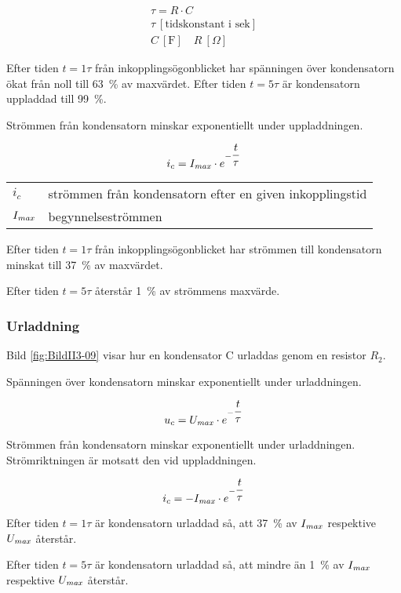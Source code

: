 \begin{gather*}
  \tau = R \cdot C \\
  \tau\ [\text{tidskonstant i sek}] \\
  C\ [\text{F}] \quad R\ [\Omega]
\end{gather*}

Efter tiden \(t = 1\tau\) från inkopplingsögonblicket har spänningen över
kondensatorn ökat från noll till 63~\% av maxvärdet.
Efter tiden \(t = 5\tau\) är kondensatorn uppladdad till 99~\%.

Strömmen från kondensatorn minskar exponentiellt under uppladdningen.

\[i_c = I_{\it max} \cdot e^{-\dfrac{t}{\tau}}\]

\begin{tabular}{lp{}}
  \(i_c\) & strömmen från kondensatorn efter en given inkopplingstid \\
  \(I_{\it max}\) & begynnelseströmmen \\
\end{tabular}

Efter tiden \(t = 1\tau\) från inkopplingsögonblicket har strömmen till
kondensatorn minskat till 37~\% av maxvärdet.

Efter tiden \(t = 5\tau\) återstår 1~\% av strömmens maxvärde.

\subsubsection{Urladdning}


Bild \ref{fig:BildII3-09} visar hur en kondensator C urladdas genom en resistor \(R_2\).

Spänningen över kondensatorn minskar exponentiellt under urladdningen.

\[u_c = U_{\it max} \cdot e^{-\dfrac{t}{\tau}}\]

Strömmen från kondensatorn minskar exponentiellt under urladdningen.
Strömriktningen är motsatt den vid uppladdningen.

\[i_c = - I_{\it max} \cdot e^{-\dfrac{t}{\tau}}\]

Efter tiden \(t = 1\tau\) är kondensatorn urladdad så, att 37~\% av \(I_{\it max}\)
respektive \(U_{\it max}\) återstår.

Efter tiden \(t = 5\tau\) är kondensatorn urladdad så, att mindre än 1~\% av
\(I_{\it max}\) respektive \(U_{\it max}\) återstår.

